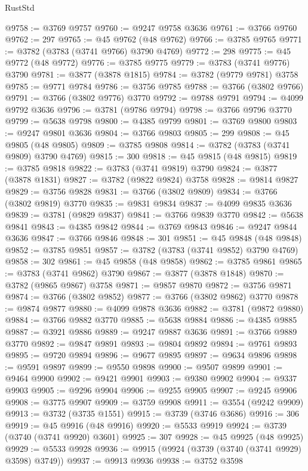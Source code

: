 \begin{lexlean}{RustStd}
\begin{coremodule}
@9758 := @3769 @9757
@9760 := @9247 @9758 @3636
@9761 := @3766 @9760
@9762 := 297
@9765 := @45 @9762 (@48 @9762)
@9766 := @3785 @9765
@9771 := @3782 (@3783 (@3741 @9766) @3790 @4769)
@9772 := 298
@9775 := @45 @9772 (@48 @9772)
@9776 := @3785 @9775
@9779 := @3783 (@3741 @9776) @3790
@9781 := @3877 (@3878 @1815)
@9784 := @3782 (@9779 @9781) @3758
@9785 := @9771 @9784
@9786 := @3756 @9785
@9788 := @3766 (@3802 @9766)
@9791 := @3766 (@3802 @9776) @3770
@9792 := @9788 @9791
@9794 := @4099 @9792 @3636
@9796 := @3781 (@9786 @9794)
@9798 := @3766 @9796 @3770
@9799 := @5638 @9798
@9800 := @4385 @9799
@9801 := @3769 @9800
@9803 := @9247 @9801 @3636
@9804 := @3766 @9803
@9805 := 299
@9808 := @45 @9805 (@48 @9805)
@9809 := @3785 @9808
@9814 := @3782 (@3783 (@3741 @9809) @3790 @4769)
@9815 := 300
@9818 := @45 @9815 (@48 @9815)
@9819 := @3785 @9818
@9822 := @3783 (@3741 @9819) @3790
@9824 := @3877 (@3878 @1831)
@9827 := @3782 (@9822 @9824) @3758
@9828 := @9814 @9827
@9829 := @3756 @9828
@9831 := @3766 (@3802 @9809)
@9834 := @3766 (@3802 @9819) @3770
@9835 := @9831 @9834
@9837 := @4099 @9835 @3636
@9839 := @3781 (@9829 @9837)
@9841 := @3766 @9839 @3770
@9842 := @5638 @9841
@9843 := @4385 @9842
@9844 := @3769 @9843
@9846 := @9247 @9844 @3636
@9847 := @3766 @9846
@9848 := 301
@9851 := @45 @9848 (@48 @9848)
@9852 := @3785 @9851
@9857 := @3782 (@3783 (@3741 @9852) @3790 @4769)
@9858 := 302
@9861 := @45 @9858 (@48 @9858)
@9862 := @3785 @9861
@9865 := @3783 (@3741 @9862) @3790
@9867 := @3877 (@3878 @1848)
@9870 := @3782 (@9865 @9867) @3758
@9871 := @9857 @9870
@9872 := @3756 @9871
@9874 := @3766 (@3802 @9852)
@9877 := @3766 (@3802 @9862) @3770
@9878 := @9874 @9877
@9880 := @4099 @9878 @3636
@9882 := @3781 (@9872 @9880)
@9884 := @3766 @9882 @3770
@9885 := @5638 @9884
@9886 := @4385 @9885
@9887 := @3921 @9886
@9889 := @9247 @9887 @3636
@9891 := @3766 @9889 @3770
@9892 := @9847 @9891
@9893 := @9804 @9892
@9894 := @9761 @9893
@9895 := @9720 @9894
@9896 := @9677 @9895
@9897 := @9634 @9896
@9898 := @9591 @9897
@9899 := @9550 @9898
@9900 := @9507 @9899
@9901 := @9464 @9900
@9902 := @9421 @9901
@9903 := @9380 @9902
@9904 := @9337 @9903
@9905 := @9296 @9904
@9906 := @9255 @9905
@9907 := @9245 @9906
@9908 := @3775 @9907
@9909 := @3759 @9908
@9911 := @3554 (@9242 @9909)
@9913 := @3732 (@3735 @1551)
@9915 := @3739 (@3746 @3686)
@9916 := 306
@9919 := @45 @9916 (@48 @9916)
@9920 := @5533 @9919
@9924 := @3739 (@3740 (@3741 @9920) @3601)
@9925 := 307
@9928 := @45 @9925 (@48 @9925)
@9929 := @5533 @9928
@9936 := @9915 (@9924 (@3739 (@3740 (@3741 @9929) @3598) @3749))
@9937 := @9913 @9936
@9938 := @3752 @3598

\end{coremodule}
\end{lexlean}
